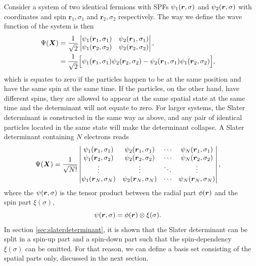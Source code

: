 Consider a system of two identical fermions with SPFs $\psi_1(\boldsymbol{{r}},\sigma)$ and $\psi_2(\boldsymbol{{r}},\sigma)$ with coordinates and spin $\boldsymbol{r}_1,\sigma_1$ and $\boldsymbol{r}_2,\sigma_2$ respectively. The way we define the wave function of the system is then
\begin{equation}
\begin{aligned}
\Psi(\boldsymbol{{X}})&=\frac{1}{\sqrt{2}}
\begin{vmatrix}
\psi_1(\boldsymbol{r}_1,\sigma_1) & \psi_2(\boldsymbol{r}_1,\sigma_1)\\
\psi_1(\boldsymbol{r}_2,\sigma_2) & \psi_2(\boldsymbol{r}_2,\sigma_2)
\end{vmatrix},\\
&=\frac{1}{\sqrt{2}}\Big[\psi_1(\boldsymbol{r}_1,\sigma_1)\psi_2(\boldsymbol{r}_2,\sigma_2)-\psi_2(\boldsymbol{r}_1,\sigma_1)\psi_1(\boldsymbol{r}_2,\sigma_2)\Big],
\end{aligned}
\end{equation}
which is equates to zero if the particles happen to be at the same position and have the same spin at the same time. If the particles, on the other hand, have different spins, they are allowed to appear at the same spatial state at the same time and the determinant will not equate to zero. For larger systems, the Slater determinant is constructed in the same way as above, and any pair of identical particles located in the same state will make the determinant collapse. A Slater determinant containing $N$ electrons reads
\begin{equation}
\Psi(\boldsymbol{{X}})=\frac{1}{\sqrt{N!}}
\begin{vmatrix}
\psi_1(\boldsymbol{r}_1,\sigma_1) & \psi_2(\boldsymbol{r}_1,\sigma_1) & \cdots & \psi_N(\boldsymbol{r}_1,\sigma_1)\\
\psi_1(\boldsymbol{r}_2,\sigma_2) & \psi_2(\boldsymbol{r}_2,\sigma_2) & \cdots & \psi_N(\boldsymbol{r}_2,\sigma_2)\\
\vdots & \vdots & \ddots & \vdots \\
\psi_1(\boldsymbol{r}_N,\sigma_N) & \psi_2(\boldsymbol{r}_N,\sigma_N) & \cdots & \psi_N(\boldsymbol{r}_N,\sigma_N)
\end{vmatrix},
\end{equation}
where the $\psi(\boldsymbol{{r}},\sigma)$ is the tensor product between the radial part $\phi(\boldsymbol{{r}})$ and the spin part $\xi(\sigma)$,
\begin{equation}
\psi(\boldsymbol{{r}},\sigma)=\phi(\boldsymbol{{r}})\otimes\xi(\sigma).
\end{equation}
In section \ref{sec:slaterdeterminant}, it is shown that the Slater determinant can be split in a spin-up part and a spin-down part such that the spin-dependency $\xi(\sigma)$ can be omitted. For that reason, we can define a basis set consisting of the spatial parts only, discussed in the next section. 


